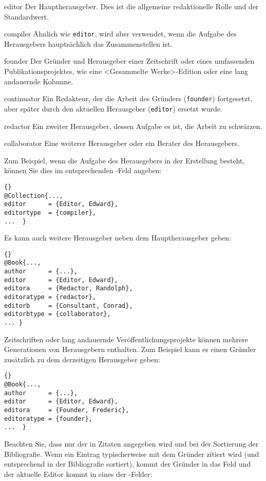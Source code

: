 \documentclass{ltxdockit}[2011/03/25]
\begin{document}
\begin{marglist} 
\setlength{\itemsep}{0pt} 
\item[editor] Der Hauptherausgeber.
Dies ist die allgemeine redaktionelle Rolle und der Standardwert.
\item[compiler] Ähnlich wie \texttt{editor}, wird aber verwendet, wenn die
Aufgabe des Herausgebers hauptsächlich das Zusammenstellen ist.  
\item[founder] Der Gründer und Herausgeber einer Zeitschrift oder eines umfassenden
Publikationsprojektes, wie eine <Gesammelte Werke>-Edition oder eine lang
andauernde Kolumne.  
\item[continuator] Ein Redakteur, der die Arbeit des
Gründers (\texttt{founder}) fortgesetzt, aber später durch den aktuellen
Herausgeber (\texttt{editor}) ersetzt wurde.  
\item[redactor] Ein zweiter
Herausgeber, dessen Aufgabe es ist, die Arbeit zu schwärzen.
\item[collaborator] Eine weiterer Herausgeber oder ein Berater des Herausgebers.
\end{marglist}
%
Zum Beispiel, wenn die Aufgabe des Herausgebers in der Erstellung besteht,
können Sie dies im entsprechenden -Feld angeben:

\begin{lstlisting}[style=bibtex]{} 
@Collection{..., 
editor      = {Editor, Edward}, 
editortype  = {compiler}, 
...  }
\end{lstlisting}
%
Es kann auch weitere Herausgeber neben dem Hauptherausgeber geben:

\begin{lstlisting}[style=bibtex]{} 
@Book{..., 
author      = {...}, 
editor      = {Editor, Edward}, 
editora     = {Redactor, Randolph}, 
editoratype = {redactor},
editorb     = {Consultant, Conrad}, 
editorbtype = {collaborator}, 
... }
\end{lstlisting}
%
Zeitschriften oder lang andauernde Veröffentlichungsprojekte können mehrere
Generationen von Herausgebern enthalten. Zum Beispiel kann es einen Gründer
zusätzlich zu dem derzeitigen Herausgeber geben:

\begin{lstlisting}[style=bibtex]{} 
@Book{..., 
author      = {...}, 
editor      = {Editor, Edward}, 
editora     = {Founder, Frederic}, 
editoratype = {founder},
...  }
\end{lstlisting}
%
Beachten Sie, dass nur der  in Zitaten angegeben wird und bei
der Sortierung der Bibliografie. Wenn ein Eintrag typischerweise mit dem
Gründer zitiert wird (und entsprechend in der Bibliografie sortiert), kommt der
Gründer in das Feld  und der aktuelle Editor kommt in eines der
-Felder:
\end{document}
